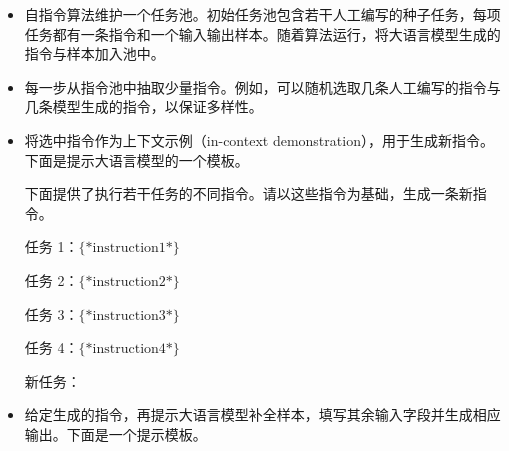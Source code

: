 \begin{itemize}
\item \vspace{0.5em} 自指令算法维护一个任务池。初始任务池包含若干人工编写的种子任务，每项任务都有一条指令和一个输入输出样本。随着算法运行，将大语言模型生成的指令与样本加入池中。
\item \vspace{0.3em} 每一步从指令池中抽取少量指令。例如，可以随机选取几条人工编写的指令与几条模型生成的指令，以保证多样性。
    \newpage
\item \vspace{0.3em} 将选中指令作为上下文示例（in-context demonstration），用于生成新指令。下面是提示大语言模型的一个模板。

    \vspace{0.5em}
    \begin{tcolorbox}

    \begingroup
    \setlength{\leftskip}{2em}
    \setlength{\rightskip}{2em}

    下面提供了执行若干任务的不同指令。请以这些指令为基础，生成一条新指令。

    \vspace{0.2cm}

    任务 1：$\{*\mathrm{instruction}1*\}$

    \vspace{0.2cm}

    任务 2：$\{*\mathrm{instruction}2*\}$

    \vspace{0.2cm}

    任务 3：$\{*\mathrm{instruction}3*\}$

    \vspace{0.2cm}

    任务 4：$\{*\mathrm{instruction}4*\}$

    \vspace{0.2cm}

    新任务：\underline{\hspace{2em}}

    \endgroup

    \end{tcolorbox}
    \vspace{0.5em}

\item \vspace{0.3em} 给定生成的指令，再提示大语言模型补全样本，填写其余输入字段并生成相应输出。下面是一个提示模板。

    \vspace{0.5em}
    \begin{tcolorbox}


\end{tcolorbox}
\end{itemize}
